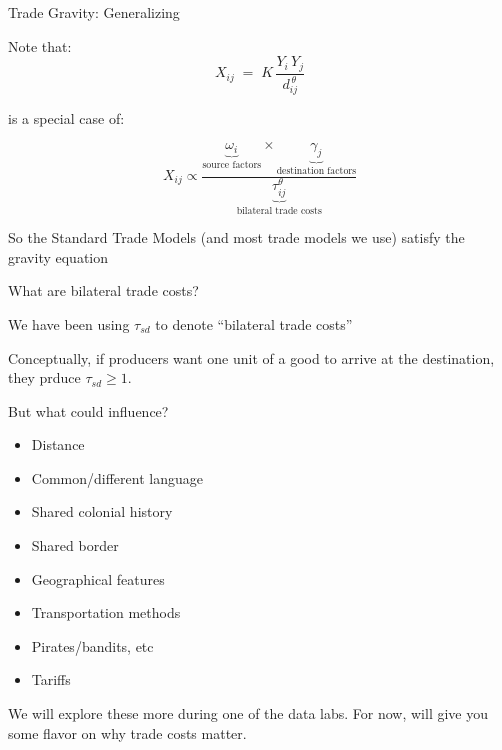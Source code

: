 \documentclass[notes,11pt, aspectratio=169, xcolor=table]{beamer}
\newenvironment{wideitemize}{\itemize\addtolength{\itemsep}{10pt}}{\enditemize}
\begin{document}
\begin{frame}{Trade Gravity: Generalizing}

\begin{wideitemize}
    \item Note that: 
    \[ X_{ij} \;=\; K \,\frac{Y_i\,Y_j}{d_{ij}^{\,\theta}} \]

    is a special case of:

    \[ X_{ij} \propto \frac{\underbrace{\omega_{i}}_{\text{source factors}} \times \underbrace{\gamma_{j}}_{\text{destination factors}}}{\underbrace{\tau_{ij}^{\theta}}_{\text{bilateral trade costs}}}  \]

    \item So the Standard Trade Models (and most trade models we use) satisfy the gravity equation
\end{wideitemize}

\end{frame}


\begin{frame}{What are bilateral trade costs?}

\begin{wideitemize}
    \item We have been using $\tau_{sd}$ to denote ``bilateral trade costs''
    \item<2-> Conceptually, if producers want one unit of a good to arrive at the destination, they prduce $\tau_{sd}\ge1$. 
    \item<3-> But what could influence?
    \begin{itemize}
        \item Distance
        \item Common/different language
        \item Shared colonial history
        \item Shared border
        \item Geographical features 
        \item Transportation methods
        \item Pirates/bandits, etc
        \item Tariffs
    \end{itemize}
    \item<4-> We will explore these more during one of the data labs. For now, will give you some flavor on why trade costs matter.

\end{wideitemize}


\end{frame}
\end{document}

